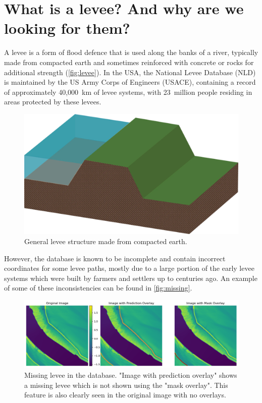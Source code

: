 \documentclass[NOTE, disdraft=true, UKenglish]{\DISCDTLATEXPATH UCLCDTDISdoc}
\begin{document}
\maketitle

\tableofcontents

\clearpage


\newpage
\section{What is a levee? And why are we looking for them?}
\label{sec:introduction}
%

A levee is a form of flood defence that is used along the banks of a river, typically made from compacted earth and sometimes reinforced with concrete or rocks for additional strength (\autoref{fig:levee}). In the USA, the National Levee Database (NLD) is maintained by the US Army Corps of Engineers (USACE), containing a record of approximately 40,000~km of levee systems, with 23~million people residing in areas protected by these levees.

\begin{figure}
    \centering
    \includegraphics[width=0.75\linewidth]{figures/levee_graphic.png}
    \caption{General levee structure made from compacted earth.}
    \label{fig:levee}
\end{figure}

However, the database is known to be incomplete and contain incorrect coordinates for some levee paths, mostly due to a large portion of the early levee systems which were built by farmers and settlers up to centuries ago. An example of some of these inconsistencies can be found in \autoref{fig:missing}.

\begin{figure}[!h]
    \centering
    \includegraphics[width=0.75\linewidth]{figures/missing_levee.png}
    \caption{Missing levee in the database. "Image with prediction overlay" shows a missing levee which is not shown using the "mask overlay". This feature is also clearly seen in the original image with no overlays.}
    \label{fig:missing}
\end{figure}
\end{document}
